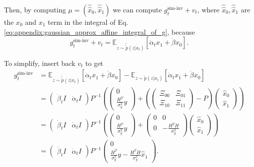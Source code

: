 Then, by computing $\mu = (\hat{\hat{x}}_0,\hat{\hat{x}}_1)$ we can compute $g_t^{\text{sim-inv}} + v_t$, where $\hat{\hat{x}}_0,\hat{\hat{x}}_1$ are the $x_0$ and $x_1$ term in the integral of Eq. \eqref{eq:appendix:gaussian_approx_affine_integral_of_g}, because
\begin{equation}
     g_t^{\text{sim-inv}} + v_t = \mathbb{E}_{z\sim\tilde{\tilde{p}}(z|x_t)} [\dot \alpha_t x_1 + \dot\beta x_0].
\end{equation}

To simplify, insert back $v_t$ to get
\begin{align}
     \nonumber g_t^{\text{sim-inv}} &= \mathbb{E}_{z\sim\tilde{\tilde{p}}(z|x_t)} [\dot \alpha_t x_1 + \dot\beta x_0] - \mathbb{E}_{z\sim \tilde{p}(z|x_t)}[\dot \alpha_t x_1 + \dot\beta x_0] \\
     \nonumber &=
     \begin{pmatrix}
     \dot\beta_t I & \dot\alpha_t I
     \end{pmatrix}
     P^{-1}
     \left(
    \begin{pmatrix}0 \\ \frac{H^T}{\sigma_y^2}y\end{pmatrix}
        +
     \left(
        \begin{pmatrix}
            \Xi_{00} & \Xi_{01} \\
            \Xi_{10} & \Xi_{11}
        \end{pmatrix}
        -
        P
    \right)
     \begin{pmatrix}\hat{x}_0 \\ \hat{x}_1 \end{pmatrix}
     \right)\\
     \nonumber &=
     \begin{pmatrix}
     \dot\beta_t I & \dot\alpha_t I
     \end{pmatrix}
     P^{-1}\left(
    \begin{pmatrix}0 \\ \frac{H^T}{\sigma_y^2}y\end{pmatrix}
        +
    \begin{pmatrix}
            0 & 0 \\
            0 & -\frac{H^TH}{\sigma_y^2}
    \end{pmatrix}
    \begin{pmatrix}\hat{x}_0 \\ \hat{x}_1 \end{pmatrix}
    \right) \\
    & = 
    \begin{pmatrix}
     \dot\beta_t I & \dot\alpha_t I
     \end{pmatrix}
     P^{-1}
    \begin{pmatrix}0 \\ \frac{H^T}{\sigma_y^2}y - \frac{H^TH}{\sigma_y^2} \hat{x}_1\end{pmatrix}.
\end{align}
